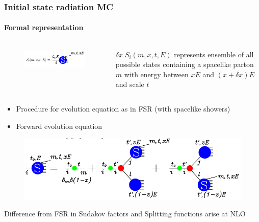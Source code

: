 \documentclass[aspectratio=43]{beamer}
\begin{document}
\begin{frame}
	
	\frametitle{Initial state radiation MC}
	\framesubtitle{Formal representation}
		
	\begin{columns}

	
		\begin{figure}
			\includegraphics[width = 4.5 cm]{plots/ISR_shower_1b.png}
		\end{figure}
	

			\footnotesize $\delta x \; S_{i}(m, x, t, E)$ represents ensemble of all possible states containing a spacelike parton $m$ with energy between $xE$ and $(x + \delta x)E$ and scale $t$
			
	\end{columns}

	\begin{itemize}
		\item \footnotesize Procedure for evolution equation as in FSR (with spacelike showers)
		\item \footnotesize Forward evolution equation
	\end{itemize}
	
	\begin{figure}
		\includegraphics[width = 8.5 cm]{plots/ISR_shower_2.png}
	\end{figure}

	\footnotesize Difference from FSR in Sudakov factors and Splitting functions arise at NLO

\end{frame}
\end{document}
